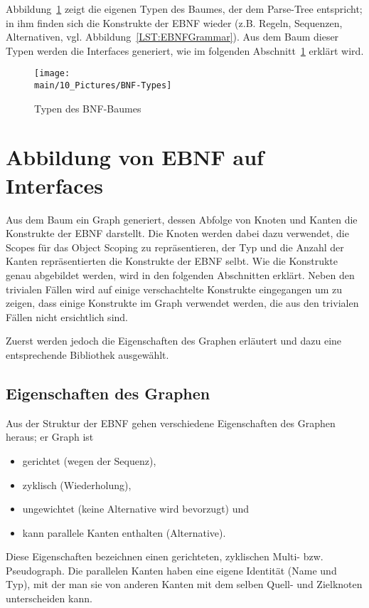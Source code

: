 \documentclass[../InterneDSLs.tex]{subfiles}
\begin{document}
Abbildung~\ref{FIG:TypesBNF} zeigt die eigenen Typen des Baumes, der dem Parse-Tree entspricht; in ihm finden sich die Konstrukte der EBNF wieder (z.B. Regeln, Sequenzen, Alternativen, vgl. Abbildung~\ref{LST:EBNFGrammar}). Aus dem Baum dieser Typen werden die Interfaces generiert, wie im folgenden Abschnitt~\ref{SEC:EBNFtoInterface} erklärt wird.

\begin{figure}[ht]
\centering
\texttt{[image: \\main/10\_Pictures/BNF-Types]}
\caption{Typen des BNF-Baumes}
\label{FIG:TypesBNF}
\end{figure}

\section{Abbildung von EBNF auf Interfaces}\label{SEC:EBNFtoInterface}
Aus dem Baum ein Graph generiert, dessen Abfolge von Knoten und Kanten die Konstrukte der EBNF darstellt. Die Knoten werden dabei dazu verwendet, die Scopes für das Object Scoping zu repräsentieren, der Typ und die Anzahl der Kanten repräsentierten die Konstrukte der EBNF selbt. Wie die Konstrukte genau abgebildet werden, wird in den folgenden Abschnitten erklärt. Neben den trivialen Fällen wird auf einige verschachtelte Konstrukte eingegangen um zu zeigen, dass einige Konstrukte im Graph verwendet werden, die aus den trivialen Fällen nicht ersichtlich sind.

Zuerst werden jedoch die Eigenschaften des Graphen erläutert und dazu eine entsprechende Bibliothek ausgewählt.

\subsection{Eigenschaften des Graphen}
Aus der Struktur der EBNF gehen verschiedene Eigenschaften des Graphen heraus; er Graph ist
\begin{itemize}
	\item gerichtet (wegen der Sequenz),
	\item zyklisch (Wiederholung),
	\item ungewichtet (keine Alternative wird bevorzugt) und
	\item kann parallele Kanten enthalten (Alternative).
\end{itemize}
Diese Eigenschaften bezeichnen einen gerichteten, zyklischen Multi- bzw. Pseudograph. Die parallelen Kanten haben eine eigene Identität (Name und Typ), mit der man sie von anderen Kanten mit dem selben Quell- und Zielknoten unterscheiden kann.
\end{document}
